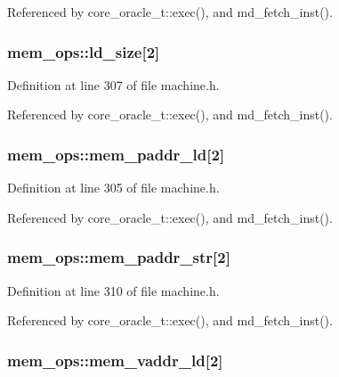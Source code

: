 Referenced by core\_\-oracle\_\-t::exec(), and md\_\-fetch\_\-inst().
\subsubsection[{ld\_\-size}]{ {\bf mem\_\-ops::ld\_\-size}[2]}\label{structmem__ops_aa559aaa21d731cda775b553c08c9a2f}




Definition at line 307 of file machine.h.

Referenced by core\_\-oracle\_\-t::exec(), and md\_\-fetch\_\-inst().
\subsubsection[{mem\_\-paddr\_\-ld}]{ {\bf mem\_\-ops::mem\_\-paddr\_\-ld}[2]}\label{structmem__ops_ebe595b6542eff03da2b3f92bb966c07}




Definition at line 305 of file machine.h.

Referenced by core\_\-oracle\_\-t::exec(), and md\_\-fetch\_\-inst().
\subsubsection[{mem\_\-paddr\_\-str}]{ {\bf mem\_\-ops::mem\_\-paddr\_\-str}[2]}\label{structmem__ops_84f77c012a6cdd392f645db63dd3b9cb}




Definition at line 310 of file machine.h.

Referenced by core\_\-oracle\_\-t::exec(), and md\_\-fetch\_\-inst().
\subsubsection[{mem\_\-vaddr\_\-ld}]{ {\bf mem\_\-ops::mem\_\-vaddr\_\-ld}[2]}\label{structmem__ops_a43937a0969b5ef7228d9a2047457c87}




